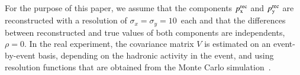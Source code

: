 For the purpose of this paper,
we assume that the components $p_{\textrm{x}}^{\textrm{rec}}$ and $p_{\textrm{y}}^{\textrm{rec}}$ are reconstructed with a resolution of $\sigma_{x} = \sigma_{y} = 10$~\GeV each
and that the differences between reconstructed and true values of both
components are independents, \ie $\rho = 0$.
In the real experiment, the covariance matrix $V$ is estimated on an
event-by-event basis,
depending on the hadronic activity in the event,
and using resolution functions that are obtained from the Monte Carlo simulation~\cite{CMS-JME-10-009,CMS-JME-13-003}.
